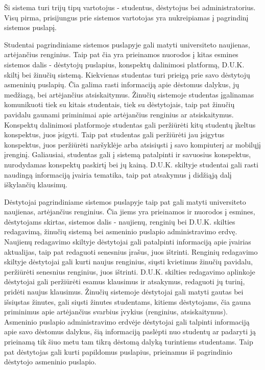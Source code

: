 \documentclass{VUMIFPSkursinis}
\begin{document}
Ši sistema turi trijų tipų vartotojus - studentus, dėstytojus bei administratorius. Visų pirma, prisijungus prie sistemos vartotojas yra nukreipiamas į pagrindinį sistemos puslapį.

Studentai pagrindiniame sistemos puslapyje gali matyti universiteto naujienas, artėjančius renginius. Taip pat čia yra prieinamos nuorodos į kitas esmines sistemos dalis - dėstytojų puslapius, konspektų dalinimosi platformą, D.U.K. skiltį bei žinučių sistemą. Kiekvienas studentas turi prieigą prie savo dėstytojų asmeninių puslapių. Čia galima rasti informaciją apie dėstomus dalykus, jų medžiagą, bei artėjančius atsiskaitymus. Žinučių sistemoje studentas įgalinamas komunikuoti tiek su kitais studentais, tiek su dėstytojais, taip pat žinučių pavidalu gaunami priminimai apie artėjančius renginius ar atsiskaitymus. Konspektų dalinimosi platformoje studentas gali peržiūrėti kitų studentų įkeltus konspektus, juos įsigyti. Taip pat studentas gali peržiūrėti jau įsigytus konspektus, juos peržiūrėti naršyklėje arba atsisiųsti į savo kompiuterį ar mobilųjį įrenginį. Galiausiai, studentas gali į sistemą patalpinti ir savuosius konspektus, nurodydamas konspektų paskirtį bei jų kainą. D.U.K. skiltyje studentai gali rasti naudingą informaciją įvairia tematika, taip pat atsakymus į didžiąją dalį iškylančių klausimų.

Dėstytojai pagrindiniame sistemos puslapyje taip pat gali matyti universiteto naujienas, artėjančius renginius. Čia jiems yra prieinamos ir nuorodos į esmines, dėstytojams skirtas, sistemos dalis - naujienų, renginių bei D.U.K. skilties redagavimą, žinučių sistemą bei asmeninio puslapio administravimo erdvę. Naujienų redagavimo skiltyje dėstytojai gali patalpinti informaciją apie įvairias aktualijas, taip pat redaguoti senesnius įrašus, juos ištrinti. Renginių redagavimo skiltyje dėstytojai gali kurti naujus renginius, siųsti kvietimus žinučių pavidalu, peržiūrėti senesnius renginius, juos ištrinti. D.U.K. skilties redagavimo aplinkoje dėstytojai gali peržiūrėti esamus klausimus ir atsakymus, redaguoti jų turinį, pridėti naujus klausimus. Žinučių sistemoje dėstytojai gali matyti gautas bei išsiųstas žinutes, gali siųsti žinutes studentams, kitiems dėstytojams, čia gauna priminimus apie artėjančius svarbius įvykius (renginius, atsiskaitymus). Asmeninio puslapio administravimo erdvėje dėstytojai gali talpinti informaciją apie savo dėstomus dalykus, šią informaciją paslėpti nuo studentų ar padaryti ją prieinamą tik šiuo metu tam tikrą dėstomą dalyką turintiems studentams. Taip pat dėstytojas gali kurti papildomus puslapius, prieinamus iš pagrindinio dėstytojo asmeninio puslapio.
\end{document}
